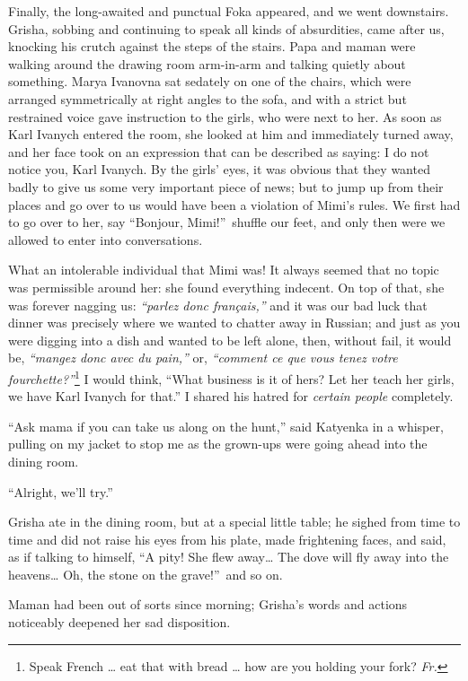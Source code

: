 Finally, the long-awaited and punctual Foka appeared, and we went downstairs. Grisha, sobbing and continuing to speak all kinds of absurdities, came after us, knocking his crutch against the steps of the stairs. Papa and maman were walking around the drawing room arm-in-arm and talking quietly about something. Marya Ivanovna sat sedately on one of the chairs, which were arranged symmetrically at right angles to the sofa, and with a strict but restrained voice gave instruction to the girls, who were next to her. As soon as Karl Ivanych entered the room, she looked at him and immediately turned away, and her face took on an expression that can be described as saying: I do not notice you, Karl Ivanych. By the girls' eyes, it was obvious that they wanted badly to give us some very important piece of news; but to jump up from their places and go over to us would have been a violation of Mimi's rules. We first had to go over to her, say ``Bonjour, Mimi!''~shuffle our feet, and only then were we allowed to enter into conversations.

What an intolerable individual that Mimi was! It always seemed that no topic was permissible around her: she found everything indecent. On top of that, she was forever nagging us: \textit{``parlez donc fran\c cais,''} and it was our bad luck that dinner was precisely where we wanted to chatter away in Russian; and just as you were digging into a dish and wanted to be left alone, then, without fail, it would be, \textit{``mangez donc avec du pain,''} or, \textit{``comment ce que vous tenez votre fourchette?''}\footnote{Speak French \ldots{} eat that with bread \ldots{} how are you holding your fork? \textit{Fr.}} I would think, ``What business is it of hers? Let her teach her girls, we have Karl Ivanych for that.'' I shared his hatred for \emph{certain people} completely. %

``Ask mama if you can take us along on the hunt,'' said Katyenka in a whisper, pulling on my jacket to stop me as the grown-ups were going ahead into the dining room. %

``Alright, we'll try.'' %

Grisha ate in the dining room, but at a special little table; he sighed from time to time and did not raise his eyes from his plate, made frightening faces, and said, as if talking to himself, ``A pity! She flew away\ldots{} The dove will fly away into the heavens\ldots{} Oh, the stone on the grave!''~and so on. %

Maman had been out of sorts since morning; Grisha's words and actions noticeably deepened her sad disposition. 

